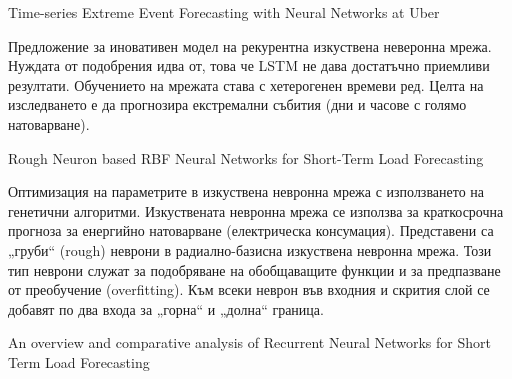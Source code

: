 ﻿Time-series Extreme Event Forecasting with Neural Networks at Uber

Предложение за иновативен модел на рекурентна изкуствена неверонна мрежа. Нуждата от подобрения идва от, това че LSTM не дава достатъчно приемливи резултати. Обучението на мрежата става с хетерогенен времеви ред. Целта на изследването е да прогнозира екстремални събития (дни и часове с голямо натоварване). 

Rough Neuron based RBF Neural Networks for Short-Term Load Forecasting

Оптимизация на параметрите в изкуствена невронна мрежа с използването на генетични алгоритми. Изкуствената невронна мрежа се използва за краткосрочна прогноза за енергийно натоварване (електрическа консумация). Представени са „груби“ (rough) неврони в радиално-базисна изкуствена невронна мрежа. Този тип неврони служат за подобряване на обобщаващите функции и за предпазване от преобучение (overfitting). Към всеки неврон във входния и скрития слой се добавят по два входа за „горна“ и „долна“ граница. 

An overview and comparative analysis of Recurrent Neural Networks for Short Term Load Forecasting


